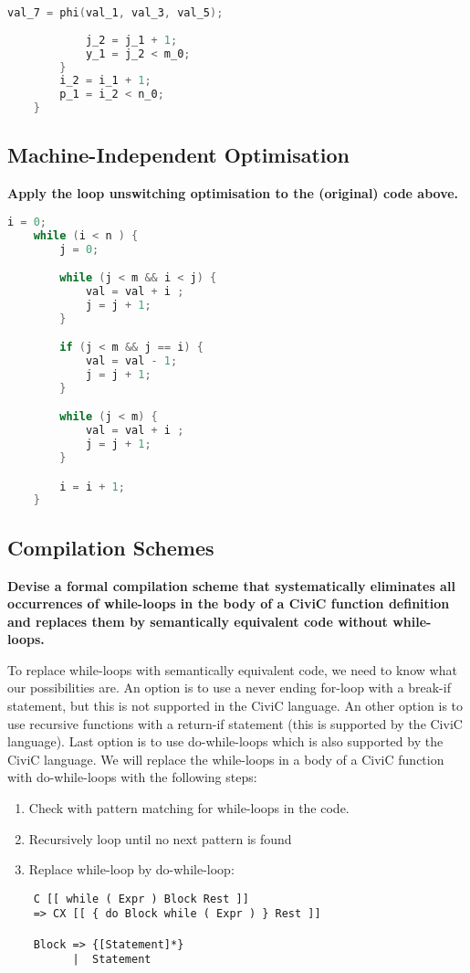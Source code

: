 \documentclass[hidelinks]{uva-inf-article}
\begin{document}
\begin{flushleft}
\begin{lstlisting}[basicstyle=\small, language=C, label=lst:code, caption=Static Single Assignment Form (SSA), captionpos=b]
            val_7 = phi(val_1, val_3, val_5);
    
            j_2 = j_1 + 1;
            y_1 = j_2 < m_0;
        }
        i_2 = i_1 + 1;
        p_1 = i_2 < n_0;
    }
\end{lstlisting}    

\subsection{Machine-Independent Optimisation}
\textbf{Apply the loop unswitching optimisation to the (original) code above.}

\begin{lstlisting}[basicstyle=\small, language=C, label=lst:code, caption=Loop unswitching optimisation, captionpos=b]
    i = 0;
    while (i < n ) {
        j = 0;

        while (j < m && i < j) {
            val = val + i ;
            j = j + 1;
        }

        if (j < m && j == i) { 
            val = val - 1;
            j = j + 1;
        }

        while (j < m) {
            val = val + i ;
            j = j + 1;
        }

        i = i + 1;
    }
\end{lstlisting}    

\subsection{Compilation Schemes}
\textbf{Devise a formal compilation scheme that systematically eliminates all occurrences of
while-loops in the body of a CiviC function definition and replaces them by semantically 
equivalent code without while-loops.}

To replace while-loops with semantically equivalent code, we need to know what our possibilities
are. An option is to use a never ending for-loop with a break-if statement, but this is not supported
in the CiviC language. An other option is to use recursive functions with a return-if statement (this
 is supported by the CiviC language). Last option is to use do-while-loops which is also supported 
by the CiviC language.
We will replace the while-loops in a body of a CiviC function with do-while-loops with the following
steps:

\begin{enumerate}
    \item Check with pattern matching for while-loops in the code.
    \item Recursively loop until no next pattern is found
    \item Replace while-loop by do-while-loop:
\end{enumerate}


\begin{lstlisting}
    C [[ while ( Expr ) Block Rest ]]
    => CX [[ { do Block while ( Expr ) } Rest ]]

    Block => {[Statement]*}
          |  Statement
\end{lstlisting}


\end{flushleft}
\end{document}
